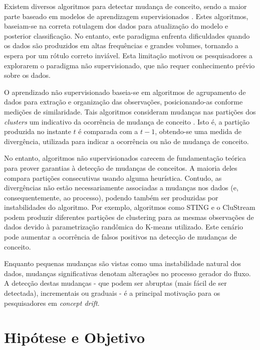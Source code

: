 \documentclass[qual, classic, a4paper]{ufbathesis}
\begin{document}
Existem diversos algoritmos para detectar mudança de conceito, sendo a maior parte baseado em modelos de aprendizagem supervisionados \cite{Gama:2014:SCD:2597757.2523813}. 
Estes algoritmos, baseiam-se na correta rotulagem dos dados para atualização do modelo e posterior classificação. No entanto, este paradigma enfrenta dificuldades quando os dados são produzidos em altas frequências e grandes volumes, tornando a espera por um rótulo correto inviável.
Esta limitação motivou os pesquisadores a explorarem o paradigma não supervisionado, que não requer conhecimento prévio sobre os dados.

O aprendizado não supervisionado baseia-se em algoritmos de agrupamento de dados para extração e organização das observações, posicionando-as conforme medições de similaridade. Tais algoritmos consideram mudanças nas partições dos \textit{clusters} um indicativo da ocorrência de mudança de conceito \cite{Aggarwal:2003:FCE:1315451.1315460}.
Isto é, a partição produzida no instante $t$ é comparada com a $t - 1$, obtendo-se uma medida de divergência, utilizada para indicar a ocorrência ou não de mudança de conceito. 

No entanto, algoritmos não supervisionados carecem de fundamentação teórica para prover garantias à detecção de mudanças de conceitos. A maioria deles compara partições consecutivas usando alguma heurística. Contudo, as divergências não estão necessariamente associadas a mudanças nos dados (e, consequentemente, ao processo), podendo também ser produzidas por instabilidades do algoritmo. Por exemplo, algoritmos como STING \cite{Wang:1997:SSI:645923.758369} e o CluStream \cite{Aggarwal:2003:FCE:1315451.1315460} podem produzir diferentes partições de clustering para as mesmas observações de dados devido à parametrização randômica do K-means utilizado. Este cenário pode aumentar a ocorrência de falsos positivos na detecção de mudanças de conceito. 

Enquanto pequenas mudanças são vistas como uma instabilidade natural dos dados, mudanças significativas denotam alterações no processo gerador do fluxo. A detecção destas mudanças - que podem ser abruptas (mais fácil de ser detectada),  incrementais ou graduais \cite{Tsymbal04theproblem} - é a principal motivação para os pesquisadores em \textit{concept drift}.


\section{Hipótese e Objetivo}
\blindtext
\end{document}

